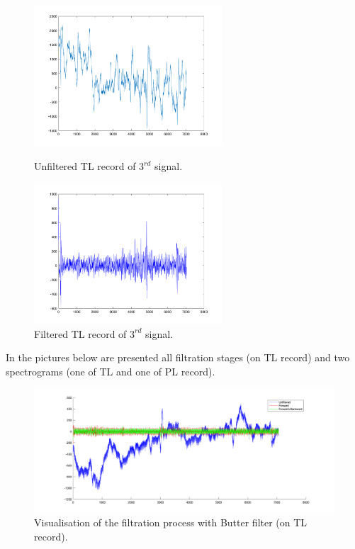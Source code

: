 \documentclass[a4paper,11pt]{article}
\begin{document}
\begin{figure}[ht!]
    \begin{minipage}{0.5\textwidth}
        \centering
        \includegraphics[width=70mm]{TL_sig3.png}
        \caption{Unfiltered TL record of $3^{rd}$ signal.}
    \end{minipage}\hfill
    \begin{minipage}{0.5\textwidth}
        \centering
        \includegraphics[width=70mm]{TL_sig3_filtered.png}
        \caption{Filtered TL record of $3^{rd}$ signal.}
    \end{minipage}\hfill
\end{figure}
\newpage
\noindent
In the pictures below are presented all filtration stages (on TL record) and two spectrograms (one of TL and one of PL record).
\begin{figure}[ht!]
    \centering
    \includegraphics[width=150mm]{TL_butter.png}
    \caption{Visualisation of the filtration process with Butter filter (on TL record).}
\end{figure}
\end{document}
